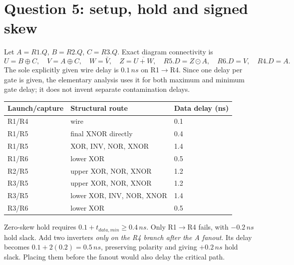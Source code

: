 \documentclass[10pt]{article}
\begin{document}
\section*{Question 5: setup, hold and signed skew}
Let $A=R1.Q$, $B=R2.Q$, $C=R3.Q$. Exact diagram connectivity is
\[U=B\oplus C,\quad V=A\oplus C,\quad W=\bar V,\quad Z=\overline{U+W},
\quad R5.D=Z\odot A,\quad R6.D=V,\quad R4.D=A.\]
The sole explicitly given wire delay is $0.1\,ns$ on R1$\to$R4. Since one delay per gate is given, the elementary analysis uses it for both maximum and minimum gate delay; it does not invent separate contamination delays.
\begin{center}\begin{tabular}{lll}\toprule
Launch/capture&Structural route&Data delay (ns)\\\midrule
R1/R4&wire&0.1\\
R1/R5&final XNOR directly&0.4\\
R1/R5&XOR, INV, NOR, XNOR&1.4\\
R1/R6&lower XOR&0.5\\
R2/R5&upper XOR, NOR, XNOR&1.2\\
R3/R5&upper XOR, NOR, XNOR&1.2\\
R3/R5&lower XOR, INV, NOR, XNOR&1.4\\
R3/R6&lower XOR&0.5\\\bottomrule
\end{tabular}\end{center}
Zero-skew hold requires $0.1+t_{data,min}\ge0.4\,ns$. Only R1$\to$R4 fails, with $-0.2\,ns$ hold slack. Add two inverters \emph{only on the R4 branch after the A fanout}. Its delay becomes $0.1+2(0.2)=0.5\,ns$, preserving polarity and giving $+0.2\,ns$ hold slack. Placing them before the fanout would also delay the critical path.
\end{document}
